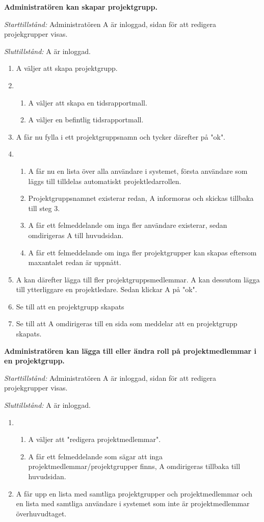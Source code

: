 \documentclass[a4paper]{article}
\begin{document}
\begin{ST}
\item
\textbf{Administratören kan skapar projektgrupp.}

\emph{Starttillstånd:} Administratören A är inloggad, sidan för att redigera projekgrupper visas.

\emph{Sluttillstånd:} A är inloggad.

\begin{enumerate}
\item A väljer att skapa projektgrupp.
\item
\begin{enumerate}
\item A väljer att skapa en tidsrapportmall.
\item A väljer en befintlig tidsrapportmall.
\end{enumerate}
\item A får nu fylla i ett projektgruppsnamn och tycker därefter på "ok".
\item 
\begin{enumerate}
\item A får nu en lista över alla användare i systemet, första användare som läggs till tilldelas automatiskt projektledarrollen.
\item Projektgruppsnamnet existerar redan, A informoras och skickas tillbaka till steg 3.
\item A får ett felmeddelande om inga fler användare existerar, sedan omdirigeras A till huvudsidan.
\item A får ett felmeddelande om inga fler projektgrupper kan skapas eftersom maxantalet redan är uppnått.
\end{enumerate}
\item A kan därefter lägga till fler projektgruppsmedlemmar. A kan dessutom lägga till ytterliggare en projektledare. Sedan klickar A på "ok".
\item Se till att en projektgrupp skapats
\item Se till att A omdirigeras till en sida som meddelar att en projektgrupp skapats.
\end{enumerate}

\item
\textbf{Administratören kan lägga till eller ändra roll på projektmedlemmar i en projektgrupp.}

\emph{Starttillstånd:} Administratören A är inloggad, sidan för att redigera projekgrupper visas.

\emph{Sluttillstånd:} A är inloggad.

\begin{enumerate}
\item 
\begin{enumerate}
\item A väljer att "redigera projektmedlemmar".
\item A får ett felmeddelande som sägar att inga projektmedlemmar/projektgrupper finns, A omdirigeras tillbaka till huvudsidan.
\end{enumerate}
\item A får upp en lista med samtliga projektgrupper och projektmedlemmar och en lista med samtliga användare i systemet som inte är projektmedlemmar överhuvudtaget.


\end{enumerate}
\end{ST}
\end{document}
